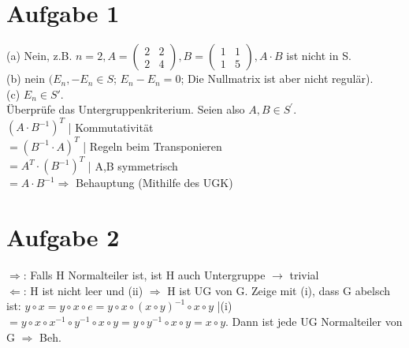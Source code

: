 \documentclass{scrartcl}
\begin{document}
\section*{Aufgabe 1}
(a) Nein, z.B. $n=2, A=\begin{pmatrix} 2 & 2 \\ 2 & 4 \end{pmatrix}, B=\begin{pmatrix} 1 & 1 \\ 1 & 5 \end{pmatrix},
A\cdot B$ ist nicht in S.\\
(b) nein $(E_n, -E_n \in S$; $E_n-E_n=0$; Die Nullmatrix ist aber nicht regulär).\\
(c) $E_n \in S'$.\\ Überprüfe das Untergruppenkriterium. Seien also $A, B \in S^\prime$.\\
	$(A\cdot B^{-1})^T$		| Kommutativität\\
	$=(B^{-1}\cdot A)^T$		| Regeln beim Transponieren\\
	$=A^T\cdot (B^{-1})^T$		| A,B symmetrisch\\
	$=A\cdot B^{-1} \Rightarrow$ Behauptung (Mithilfe des UGK)

\section*{Aufgabe 2}

$\Rightarrow$: Falls H Normalteiler ist, ist H auch Untergruppe $\rightarrow$ trivial\\
$\Leftarrow$: H ist nicht leer und (ii) $\Rightarrow$ H ist UG von G. Zeige mit (i), dass G abelsch ist:
$y\circ x=y\circ x\circ e=y\circ x\circ (x\circ y)^{-1}\circ x\circ y	$ |(i) \\
$=y\circ x\circ x^{-1}\circ y^{-1}\circ x\circ y=y\circ y^{-1}\circ x\circ y=x\circ y$.
Dann ist jede UG Normalteiler von G $\Rightarrow$ Beh.
\end{document}
